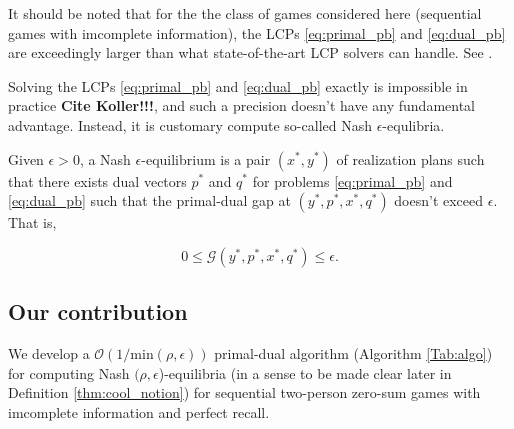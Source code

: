 \documentclass[envcountsame]{llcns2e/llncs}
\begin{document}

\begin{remark}  
It should be noted that for the the class of games considered here (sequential games with imcomplete information), the LCPs \eqref{eq:primal_pb} and \eqref{eq:dual_pb} are exceedingly larger than what state-of-the-art LCP solvers can handle. See \cite{hoda2010smoothing}.
\end{remark}

Solving the LCPs \eqref{eq:primal_pb} and \eqref{eq:dual_pb} exactly is impossible in practice \textbf{Cite Koller!!!}, and such a precision doesn't have any fundamental advantage. Instead, it is customary compute so-called Nash $\epsilon$-equlibria.

\begin{definition}
Given $\epsilon > 0$, a Nash $\epsilon$-equilibrium is
a pair $(x^*, y^*)$ of realization plans such that there exists dual
vectors $p^*$ and $q^*$ for problems \eqref{eq:primal_pb} and
\eqref{eq:dual_pb} such that the primal-dual gap at $(y^*, p^*, x^*, q^*)$
doesn't exceed $\epsilon$. That is,

\begin{equation}
  0 \le \mathcal{G}(y^*, p^*, x^*, q^*) \le \epsilon.
\label{eq:approx_pb}
\end{equation}
\label{thm:approx_nash}
\end{definition}

\subsection{Our contribution}
We develop a $\mathcal{O}(1/\text{min}(\rho,\epsilon))$ primal-dual
algorithm (Algorithm \ref{Tab:algo}) for computing Nash $(\rho,
  \epsilon$)-equilibria (in a sense to be made clear later in
  Definition \ref{thm:cool_notion}) for
  sequential two-person zero-sum games with imcomplete information and
  perfect recall.
\end{document}
